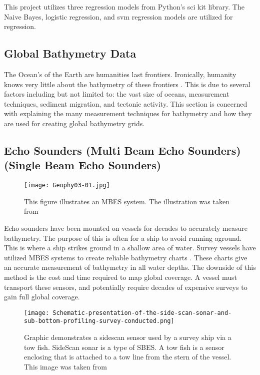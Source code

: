 
This project utilizes three regression models from Python's sci kit library.
The Naive Bayes\cite{sklearn_api}, logistic regression\cite{sklearn_api}, and svm regression\cite{sklearn_api} models are utilized for regression.

\subsection{Global Bathymetry Data}
The Ocean's of the Earth are humanities last frontiers.
Ironically, humanity knows very little about the bathymetry of these frontiers \cite{becker2009global}.
This is due to several factors including but not limited to: the vast size of oceans, measurement techniques, sediment migration, and tectonic activity.
This section is concerned with explaining the many measurement techniques for bathymetry and how they are used for creating global bathymetry grids.

\subsection{Echo Sounders (Multi Beam Echo Sounders)(Single Beam Echo Sounders) }

\begin{figure}[htp]
    \centering
    \texttt{[image: Geophy03-01.jpg]}
    \caption{This figure illustrates an \ac{MBES} system. The illustration was taken from \cite{monacoWeb}}
    \label{fig:MBES}
\end{figure}

Echo sounders have been mounted on vessels for decades to accurately measure bathymetry.
The purpose of this is often for a ship to avoid running aground.
This is where a ship strikes ground in a shallow area of water.
Survey vessels have utilized \ac{MBES} systems to create reliable bathymetry charts \cite{farr1980multibeam}.
These charts give an accurate measurement of bathymetry in all water depths.
The downside of this method is the cost and time required to map global coverage.
A vessel must transport these sensors, and potentially require decades of expensive surveys to gain full global coverage.

\begin{figure}[htp]
    \centering
    \texttt{[image: Schematic-presentation-of-the-side-scan-sonar-and-sub-bottom-profiling-survey-conducted.png]}
    \caption{Graphic demonstrates a sidescan sensor used by a survey ship via a tow fish.
    SideScan sonar is a type of \ac{SBES}.
    A tow fish is a sensor enclosing that is attached to a tow line from the stern of the vessel.
    This image was taken from \cite{sakellariou2015preliminary}}
    \label{fig:sidescandemo}
\end{figure}


